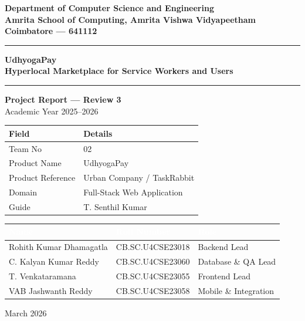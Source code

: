 \documentclass[12pt,a4paper]{report}
\begin{document}
\begin{titlepage}
  \centering
  \vspace*{1.5cm}

  {\fontsize{16}{20}\selectfont\bfseries\color{primaryblue}
    Department of Computer Science and Engineering\\[4pt]
    Amrita School of Computing, Amrita Vishwa Vidyapeetham\\[4pt]
    Coimbatore — 641112
  }

  \vspace{1cm}
  \noindent\rule{\textwidth}{2pt}
  \vspace{0.3cm}

  {\fontsize{22}{28}\selectfont\bfseries\color{primaryblue}
    UdhyogaPay\\[6pt]
  }
  {\fontsize{15}{20}\selectfont\bfseries
    Hyperlocal Marketplace for Service Workers and Users
  }

  \vspace{0.3cm}
  \noindent\rule{\textwidth}{2pt}
  \vspace{1cm}

  {\large\bfseries Project Report — Review 3}\\[6pt]
  {\large Academic Year 2025--2026}

  \vspace{1.5cm}

  \begin{tabular}{|p{5cm}|p{8cm}|}
  \hline
  \rowcolor{lightgray}
  \textbf{Field} & \textbf{Details} \\
  \hline
  Team No & 02 \\
  \hline
  Product Name & UdhyogaPay \\
  \hline
  Product Reference & Urban Company / TaskRabbit \\
  \hline
  Domain & Full-Stack Web Application \\
  \hline
  Guide & T. Senthil Kumar \\
  \hline
  \end{tabular}

  \vspace{1.5cm}

  \begin{tabular}{|p{4cm}|p{6cm}|p{3cm}|}
  \hline
  \rowcolor{tableheader}
  \textcolor{white}{\textbf{Name}} &
  \textcolor{white}{\textbf{Roll Number}} &
  \textcolor{white}{\textbf{Role}} \\
  \hline
  Rohith Kumar Dhamagatla & CB.SC.U4CSE23018 & Backend Lead \\
  \hline
  C. Kalyan Kumar Reddy   & CB.SC.U4CSE23060 & Database \& QA Lead \\
  \hline
  T. Venkataramana        & CB.SC.U4CSE23055 & Frontend Lead \\
  \hline
  VAB Jashwanth Reddy     & CB.SC.U4CSE23058 & Mobile \& Integration \\
  \hline
  \end{tabular}

  \vfill

  {\large March 2026}
\end{titlepage}
\end{document}

